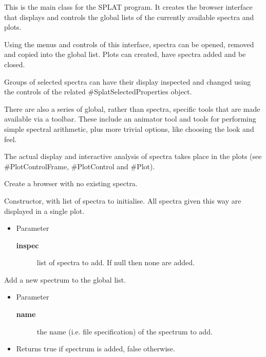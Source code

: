 {This is the main class for the SPLAT program. It creates the
 browser interface that displays and controls the global lists of
 the currently available spectra and plots.
 
 Using the menus and controls of this interface, spectra can be
 opened, removed and copied into the global list. Plots can created,
 have spectra added and be closed.
 
 Groups of selected spectra can have their display inspected and
 changed using the controls of the related \#SplatSelectedProperties
 object.
 
 There are also a series of global, rather than spectra, specific
 tools that are made available via a toolbar. These include an
 animator tool and tools for performing simple spectral arithmetic,
 plus more trivial options, like choosing the look and feel.
 
 The actual display and interactive analysis of spectra takes place
 in the plots (see \#PlotControlFrame, \#PlotControl and \#Plot).}

\constructors
{}
\begin{desc}Create a browser with no existing spectra.
\end{desc}

\begin{desc}Constructor, with list of spectra to initialise. All spectra
 given this way are displayed in a single plot.
\begin{itemize}
\item{Parameter
  \begin{description}
   \item[\textbf{inspec}]{list of spectra to add. If null then none are
                added.}
  \end{description}}
\end{itemize}
\end{desc}

\methods
{}
\begin{desc}Add a new spectrum to the global list.
\begin{itemize}
\item{Parameter
  \begin{description}
   \item[\textbf{name}]{the name (i.e. file specification) of the spectrum
              to add.}
  \end{description}}
\end{itemize}
\begin{itemize}
\item{Returns true if spectrum is added, false otherwise. }
\end{itemize}
\end{desc}

